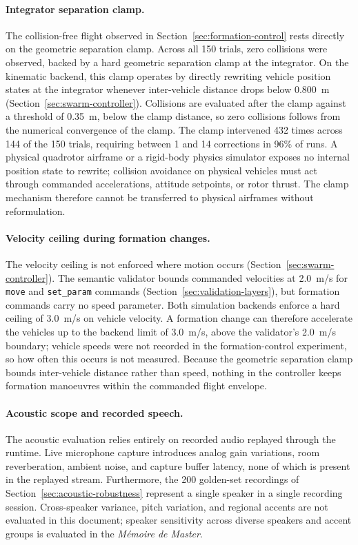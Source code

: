 \paragraph{Integrator separation clamp.} The collision-free flight observed in
Section~\ref{sec:formation-control} rests directly on the geometric separation clamp. Across all 150
trials, zero collisions were observed, backed by a hard geometric separation clamp at the integrator.
On the kinematic backend, this clamp operates by directly rewriting vehicle position states at the
integrator whenever inter-vehicle distance drops below 0.800~m (Section~\ref{sec:swarm-controller}).
Collisions are evaluated after the clamp against a threshold of 0.35~m, below the clamp distance, so zero collisions follows from
the numerical convergence of the clamp. The clamp intervened 432 times across 144 of the 150 trials,
requiring between 1 and 14 corrections in 96\% of runs. A physical quadrotor airframe or a rigid-body
physics simulator exposes no internal position state to rewrite; collision avoidance on physical
vehicles must act through commanded accelerations, attitude setpoints, or rotor thrust. The clamp
mechanism therefore cannot be transferred to physical airframes without reformulation.

\paragraph{Velocity ceiling during formation changes.} The velocity ceiling is not enforced where motion
occurs (Section~\ref{sec:swarm-controller}). The semantic validator bounds commanded velocities at
2.0~m/s for \texttt{move} and \texttt{set\_param} commands (Section~\ref{sec:validation-layers}), but
formation commands carry no speed parameter. Both simulation backends enforce a hard ceiling of 3.0~m/s
on vehicle velocity. A formation change can therefore accelerate the vehicles up to the backend limit of 3.0~m/s, above the
validator's 2.0~m/s boundary; vehicle speeds were not recorded in the formation-control experiment, so how
often this occurs is not measured. Because the geometric separation clamp bounds inter-vehicle distance
rather than speed, nothing in the controller keeps formation manoeuvres within the commanded flight
envelope.

\paragraph{Acoustic scope and recorded speech.} The acoustic evaluation relies entirely on recorded
audio replayed through the runtime. Live microphone capture introduces analog gain variations, room
reverberation, ambient noise, and capture buffer latency, none of which is present in the replayed
stream. Furthermore, the 200 golden-set recordings of Section~\ref{sec:acoustic-robustness} represent a
single speaker in a single recording session. Cross-speaker variance, pitch variation, and regional
accents are not evaluated in this document; speaker sensitivity across diverse speakers and accent groups
is evaluated in the \emph{M\'emoire de Master}.

